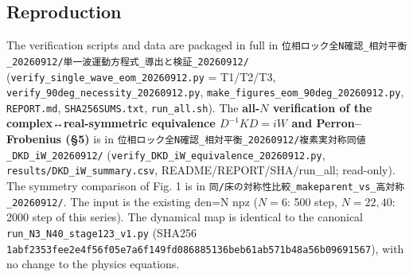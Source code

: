 \documentclass[
  a4paper,
]{ltjsarticle}
\begin{document}
\subsection{Reproduction}\label{reproduction}

The verification scripts and data are packaged in full in
\texttt{位相ロック全N確認\_相対平衡\_20260912/単一波運動方程式\_導出と検証\_20260912/}
(\texttt{verify\_single\_wave\_eom\_20260912.py} = T1/T2/T3,
\texttt{verify\_90deg\_necessity\_20260912.py},
\texttt{make\_figures\_eom\_90deg\_20260912.py}, \texttt{REPORT.md},
\texttt{SHA256SUMS.txt}, \texttt{run\_all.sh}). The \textbf{all-\(N\)
verification of the complex↔real-symmetric equivalence \(D^{-1}KD=iW\)
and Perron--Frobenius (§5)} is in
\texttt{位相ロック全N確認\_相対平衡\_20260912/複素実対称同値\_DKD\_iW\_20260912/}
(\texttt{verify\_DKD\_iW\_equivalence\_20260912.py},
\texttt{results/DKD\_iW\_summary.csv}, README/REPORT/SHA/run\_all;
read-only). The symmetry comparison of Fig. 1 is in
\texttt{同/床の対称性比較\_makeparent\_vs\_高対称\_20260912/}. The input
is the existing den=N npz (\(N=6\): 500 step, \(N=22,40\): 2000 step of
this series). The dynamical map is identical to the canonical
\texttt{run\_N3\_N40\_stage123\_v1.py} (SHA256
\texttt{1abf2353fee2e4f56f05e7a6f149fd086885136beb61ab571b48a56b09691567}),
with no change to the physics equations.
\end{document}
